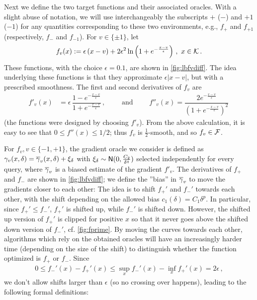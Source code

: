 Next we define the two target functions and their associated oracles. With a slight abuse of notation, we will use interchangeably the subscripts $+$ ($-$) and $+1$ ($-1$) for any quantities corresponding to these two environments, e.g., $f_+$ and $f_{+1}$ (respectively, $f_-$ and $f_{-1}$).
For $v \in \{\pm 1\}$, let
\begin{align*}
f_v(x) :=  \epsilon\left( x-v\right)+2\epsilon^2 \ln\left(1+e^{-\frac{x-v}{\epsilon}}  \right)\,,
\,\, x \in \mathcal{K}\,.
\end{align*}
These functions, with the choice $\epsilon=0.1$, are shown in \cref{fig:lbfvdiff}. 
The idea underlying these functions is that they approximate $\epsilon|x-v|$, but with a prescribed smoothness.
The first and second derivatives of $f_v$ are
\begin{align*}
f'_v(x) &=\epsilon\, \dfrac{1-e^{-\frac{x-v}{\epsilon}}}{1+e^{-\frac{x-v}{\epsilon}}} \,, \qquad \text{ and } \qquad
f''_v(x) = \dfrac{2e^{-\frac{x-v}{\epsilon}} }{\left(  1+e^{-\frac{x-v}{\epsilon}}\right)^2}  \,
\end{align*}
(the functions were designed by choosing $f'_v$).
From the above calculation, it is easy to see that $0 \le f''(x) \le 1/2$; thus $f_v$ is $\frac{1}{2}$-smooth, and so $f_v\in \mathcal{F}$.

For $f_v, v\in\{-1,+1\}$, the gradient oracle we consider is defined as $\gamma_v(x,\delta)=\overline{\gamma}_v(x,\delta)+\xi_\delta$ with $\xi_\delta \sim \mathsf{N}(0,\frac{C_2}{\delta^q})$ selected independently for every query, where $\overline{\gamma}_v$ is a biased estimate of the gradient $f'_v$. 
The derivatives of $f_+$ and $f_-$ are shown in \cref{fig:lbfvdiff}; we define the ''bias'' in $\overline{\gamma}_v$ to move the gradients closer to each other:
The idea is to shift $f_+'$ and $f_-'$ towards each other, with the shift depending on the allowed bias $c_1(\delta) = C_1\delta^p$.
In particular, since $f_+'\le f_-'$, $f_+'$ is shifted up, while $f_-'$ is shifted down. 
However, the shifted up version of $f_+'$ is clipped for positive $x$ so that it never goes above the 
shifted down version of $f_-'$, cf. \cref{fig:fprime}.
 By moving the curves towards each other, algorithms which rely on the obtained oracles
will have an increasingly harder time (depending on the size of the shift) to distinguish whether the function optimized is $f_+$ or $f_-$. Since
\begin{align*}
0\le f_-'(x) - f_+'(x) \le \sup_{x} f_-'(x) - \inf_x f_+'(x) = 2\epsilon\,,
\end{align*}
we don't allow shifts larger than $\epsilon$ (so no crossing over happens), leading to the following formal definitions:



